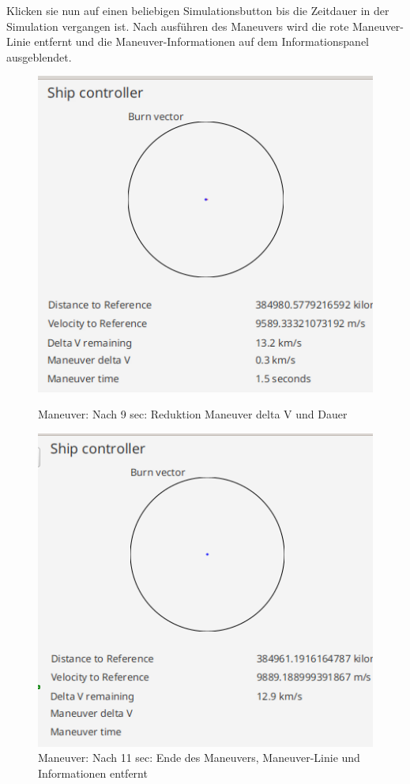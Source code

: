 Klicken sie nun auf einen beliebigen Simulationsbutton bis die Zeitdauer in der Simulation vergangen ist.
Nach ausführen des Maneuvers wird die rote Maneuver-Linie entfernt und die Maneuver-Informationen auf dem Informationspanel ausgeblendet.

\begin{figure}[H]
	\centering
	\begin{minipage}[b]{0.45\textwidth}
		\includegraphics[width=\textwidth]{res/burn3.png}
		\caption{Maneuver: Nach 9 sec: Reduktion Maneuver delta V und Dauer}
	\end{minipage}
	\hfill
	\begin{minipage}[b]{0.45\textwidth}
		\includegraphics[width=\textwidth]{res/burn4.png}
		\caption{Maneuver: Nach 11 sec: Ende des Maneuvers, Maneuver-Linie und Informationen entfernt}
	\end{minipage}
\end{figure}

